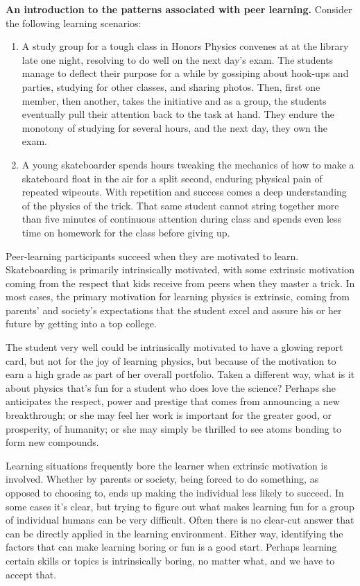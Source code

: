 \textbf{An introduction to the \textbf{patterns} associated with peer
learning.} Consider the following learning scenarios:

\begin{enumerate}
\item
  A study group for a tough class in Honors Physics convenes at at the
  library late one night, resolving to do well on the next day's exam.
  The students manage to deflect their purpose for a while by gossiping
  about hook-ups and parties, studying for other classes, and sharing
  photos. Then, first one member, then another, takes the initiative and
  as a group, the students eventually pull their attention back to the
  task at hand. They endure the monotony of studying for several hours,
  and the next day, they own the exam.
\item
  A young skateboarder spends hours tweaking the mechanics of how to
  make a skateboard float in the air for a split second, enduring
  physical pain of repeated wipeouts. With repetition and success comes
  a deep understanding of the physics of the trick. That same student
  cannot string together more than five minutes of continuous attention
  during class and spends even less time on homework for the class
  before giving up.
\end{enumerate}
Peer-learning participants succeed when they are motivated to learn.
Skateboarding is primarily intrinsically motivated, with some extrinsic
motivation coming from the respect that kids receive from peers when
they master a trick. In most cases, the primary motivation for learning
physics is extrinsic, coming from parents' and society's expectations
that the student excel and assure his or her future by getting into a
top college.

The student very well could be intrinsically motivated to have a glowing
report card, but not for the joy of learning physics, but because of the
motivation to earn a high grade as part of her overall portfolio. Taken
a different way, what is it about physics that's fun for a student who
does love the science? Perhaps she anticipates the respect, power and
prestige that comes from announcing a new breakthrough; or she may feel
her work is important for the greater good, or prosperity, of humanity;
or she may simply be thrilled to see atoms bonding to form new
compounds.

Learning situations frequently bore the learner when extrinsic
motivation is involved. Whether by parents or society, being forced to
do something, as opposed to choosing to, ends up making the individual
less likely to succeed. In some cases it's clear, but trying to figure
out what makes learning fun for a group of individual humans can be very
difficult. Often there is no clear-cut answer that can be directly
applied in the learning environment. Either way, identifying the factors
that can make learning boring or fun is a good start. Perhaps learning
certain skills or topics is intrinsically boring, no matter what, and we
have to accept that.

